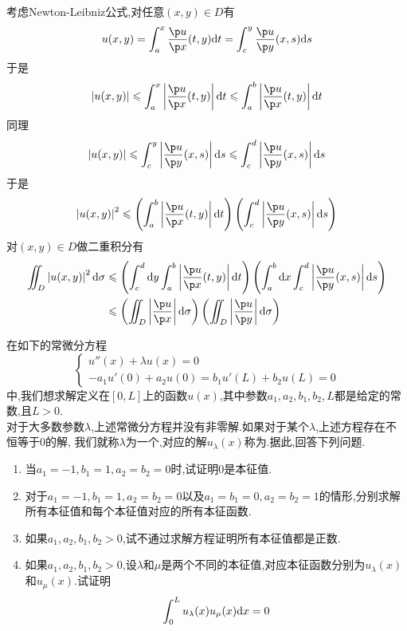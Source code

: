\documentclass{ctexart}
\begin{document}
\begin{solution}
    考虑Newton-Leibniz公式,对任意$(x,y)\in D$有
    \[u(x,y)=\int_a^x\dfrac{\p u}{\p x}(t,y)\di t=\int_c^y\dfrac{\p u}{\p y}(x,s)\di s\]
    于是
    \[\left|u(x,y)\right|\leqslant\int_a^x\left|\dfrac{\p u}{\p x}(t,y)\right|\di t\leqslant\int_a^b\left|\dfrac{\p u}{\p x}(t,y)\right|\di t\]
    同理
    \[\left|u(x,y)\right|\leqslant\int_c^y\left|\dfrac{\p u}{\p y}(x,s)\right|\di s\leqslant\int_c^d\left|\dfrac{\p u}{\p y}(x,s)\right|\di s\]
    于是
    \[\left|u(x,y)\right|^2\leqslant\left(\int_a^b\left|\dfrac{\p u}{\p x}(t,y)\right|\di t\right)\left(\int_c^d\left|\dfrac{\p u}{\p y}(x,s)\right|\di s\right)\]
    对$(x,y)\in D$做二重积分有
    \[\begin{aligned}
        \iint_D\left|u(x,y)\right|^2\di\sigma
        &\leqslant \left(\int_c^d\di y\int_a^b\left|\dfrac{\p u}{\p x}(t,y)\right|\di t\right)\left(\int_a^b\di x\int_c^d\left|\dfrac{\p u}{\p y}(x,s)\right|\di s\right) \\
        &\leqslant \left(\iint_D\left|\dfrac{\p u}{\p x}\right|\di\sigma\right)\left(\iint_D\left|\dfrac{\p u}{\p y}\right|\di\sigma\right)
    \end{aligned}\]

\end{solution}
\begin{problem}[9.(15\songti{分})]
    在如下的常微分方程
    \[\left\{\begin{array}{l}
        u''(x)+\lambda u(x)=0\\
        -a_1u'(0)+a_2u(0)=b_1u'(L)+b_2u(L)=0
    \end{array}\right.\]
    中,我们想求解定义在$[0,L]$上的函数$u(x)$,其中参数$a_1,a_2,b_1,b_2,L$都是给定的常数,且$L>0$.\\
    对于大多数参数$\lambda$,上述常微分方程并没有非零解.如果对于某个$\lambda$,上述方程存在不恒等于$0$的解,%
    我们就称$\lambda$为一个,对应的解$u_\lambda(x)$称为.据此,回答下列问题.
    \begin{enumerate}[label=\tbf{(\arabic*)}]
        \item 当$a_1=-1,b_1=1,a_2=b_2=0$时,试证明$0$是本征值.
        \item 对于$a_1=-1,b_1=1,a_2=b_2=0$以及$a_1=b_1=0,a_2=b_2=1$的情形,分别求解所有本征值和每个本征值对应的所有本征函数.
        \item 如果$a_1,a_2,b_1,b_2>0$,试不通过求解方程证明所有本征值都是正数.
        \item 如果$a_1,a_2,b_1,b_2>0$,设$\lambda$和$\mu$是两个不同的本征值,对应本征函数分别为$u_\lambda(x)$和$u_\mu(x)$.试证明
            \[\int_0^Lu_\lambda(x)u_\mu(x)\mathrm{d} x=0\]

    \end{enumerate}
\end{problem}
\end{document}
